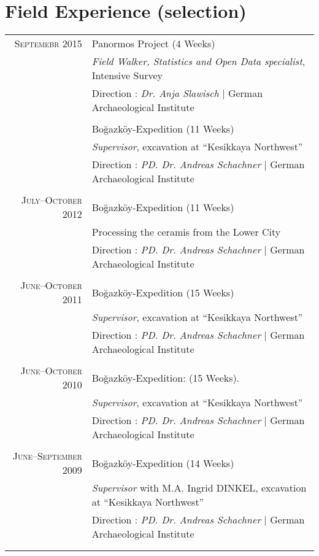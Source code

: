 \section{Field Experience (selection)}

\begin{longtable}{rl}	
\textsc{Septemebr 2015}  & Panormos Project (4 Weeks)\\
&  \textit{Field Walker, Statistics and Open Data specialist}, Intensive Survey \\
& \small{Direction :  \emph{Dr. Anja Slawisch}  | German Archaeological Institute}\\
& \\


\opt{BoLong}{
\textsc{July--October 2013}  & Bo\u{g}azköy-Expedition (11 Weeks)\\
&  \textit{Supervisor}, excavation at ``Kesikkaya Northwest'' \\
& \small{Direction :  \emph{PD. Dr. Andreas Schachner}  | German Archaeological Institute}\\
& \\

\textsc{July--October 2012}  & Bo\u{g}azköy-Expedition (11 Weeks)\\
& Processing the ceramis from the Lower City\\
& \small{Direction :  \emph{PD. Dr. Andreas Schachner}  | German Archaeological Institute}\\
& \\

\textsc{June--October 2011}  &  Bo\u{g}azköy-Expedition (15 Weeks)\\
& \textit{Supervisor}, excavation at ``Kesikkaya Northwest'' \\
& \small{Direction :  \emph{PD. Dr. Andreas Schachner}  | German Archaeological Institute}\\
& \\

\textsc{June--October 2010}  &  Bo\u{g}azköy-Expedition:   (15 Weeks). \\
& \textit{Supervisor}, excavation at ``Kesikkaya Northwest'' \\
& \small{Direction :  \emph{PD. Dr. Andreas Schachner}  | German Archaeological Institute}\\
& \\

\textsc{June--September 2009}  &  Bo\u{g}azköy-Expedition (14 Weeks) \\
& \textit{Supervisor} with M.A. Ingrid DINKEL, excavation at ``Kesikkaya Northwest'' \\
& \small{Direction :  \emph{PD. Dr. Andreas Schachner}  | German Archaeological Institute}\\
& \\
}


\end{longtable}
